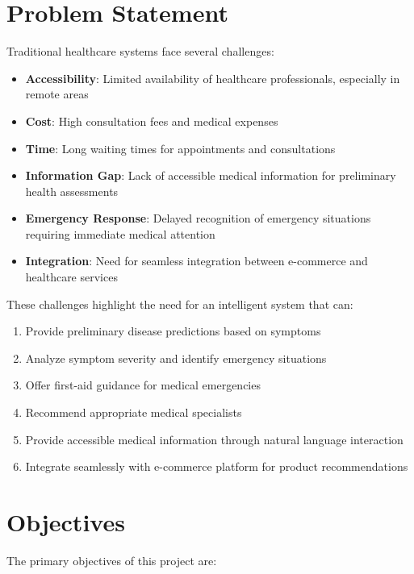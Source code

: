 \documentclass[12pt,a4paper]{article}
\begin{document}
\section{Problem Statement}
Traditional healthcare systems face several challenges:

\begin{itemize}
    \item \textbf{Accessibility}: Limited availability of healthcare professionals, especially in remote areas
    \item \textbf{Cost}: High consultation fees and medical expenses
    \item \textbf{Time}: Long waiting times for appointments and consultations
    \item \textbf{Information Gap}: Lack of accessible medical information for preliminary health assessments
    \item \textbf{Emergency Response}: Delayed recognition of emergency situations requiring immediate medical attention
    \item \textbf{Integration}: Need for seamless integration between e-commerce and healthcare services
\end{itemize}

These challenges highlight the need for an intelligent system that can:
\begin{enumerate}
    \item Provide preliminary disease predictions based on symptoms
    \item Analyze symptom severity and identify emergency situations
    \item Offer first-aid guidance for medical emergencies
    \item Recommend appropriate medical specialists
    \item Provide accessible medical information through natural language interaction
    \item Integrate seamlessly with e-commerce platform for product recommendations
\end{enumerate}

\section{Objectives}
The primary objectives of this project are:
\end{document}
